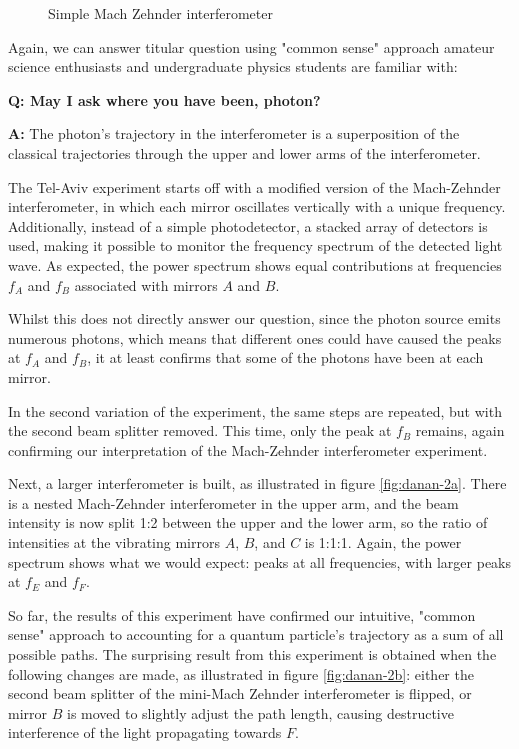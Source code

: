 \documentclass{article}
\newcommand{\Q}{\bfseries Q: }
\newcommand{\A}{\par\textbf{A:} \normalfont}
\begin{document}
\begin{figure}
	
	\caption{Simple Mach Zehnder interferometer}
	\label{fig:interferometer1}
\end{figure}

Again, we can answer titular question using "common sense" approach amateur 
science enthusiasts and undergraduate physics students are familiar with:

\medskip\Q May I ask where you have been, photon?  

\A The photon's trajectory in the interferometer is a superposition of the 
classical trajectories through the upper and lower arms of the 
interferometer.\medskip

The Tel-Aviv experiment starts off with a modified version of the Mach-Zehnder 
interferometer, in which each mirror oscillates vertically with a unique 
frequency.  Additionally, instead of a simple photodetector, a stacked array of 
detectors is used, making it possible to monitor the frequency spectrum of the 
detected light wave. As expected, the power spectrum shows equal contributions 
at frequencies $f_A$ and $f_B$ associated with mirrors $A$ and $B$. 

Whilst this does not directly answer our question, since the photon source 
emits numerous photons, which means that different ones could have caused the 
peaks at $f_A$ and $f_B$, it at least confirms that some of the photons have 
been at each mirror. 

In the second variation of the experiment, the same steps are repeated, but 
with the second beam splitter removed. This time, only the peak at $f_B$ 
remains, again confirming our interpretation of the Mach-Zehnder interferometer 
experiment. 

Next, a larger interferometer is built, as illustrated in figure 
\ref{fig:danan-2a}. There is a nested Mach-Zehnder interferometer in the upper 
arm, and the beam intensity is now split 1:2 between the upper and the lower 
arm, so the ratio of intensities at the vibrating mirrors $A$, $B$, and $C$ is 
1:1:1.  Again, the power spectrum shows what we would expect: peaks at all 
frequencies, with larger peaks at $f_E$ and $f_F$. 

So far, the results of this experiment have confirmed our intuitive, "common 
sense" approach to accounting for a quantum particle's trajectory as a sum of 
all possible paths. The surprising result from this experiment is obtained when 
the following changes are made, as illustrated in figure \ref{fig:danan-2b}:
either the second beam splitter of the mini-Mach Zehnder interferometer is 
flipped, or mirror $B$ is moved to slightly adjust the path length, causing 
destructive interference of the light propagating towards $F$. 
\end{document}
